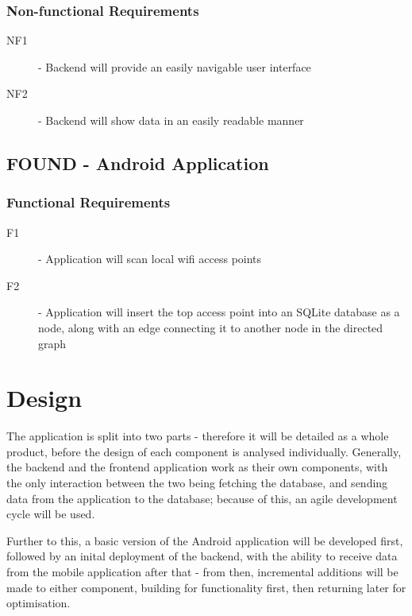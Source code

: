\documentclass[11pt]{informatics-report}
\begin{document}
\subsection{Non-functional Requirements}

\begin{description}
\item[NF1] - Backend will provide an easily navigable user interface
\item[NF2] - Backend will show data in an easily readable manner
\end{description}

\section{FOUND - Android Application}

\subsection{Functional Requirements}

\begin{description}
\item[F1] - Application will scan local wifi access points
\item[F2] - Application will insert the top access point into an SQLite database as a node, along with an edge connecting it to another node in the directed graph
\end{description}

\chapter{Design}
The application is split into two parts - therefore it will be detailed as a whole product, before the design of each component is analysed individually. Generally, the backend and the frontend application work as their own components, with the only interaction between the two being fetching the database, and sending data from the application to the database; because of this, an agile development cycle will be used. 

Further to this, a basic version of the Android application will be developed first, followed by an inital deployment of the backend, with the ability to receive data from the mobile application after that - from then, incremental additions will be made to either component, building for functionality first, then returning later for optimisation. 
\newpage
\end{document}
